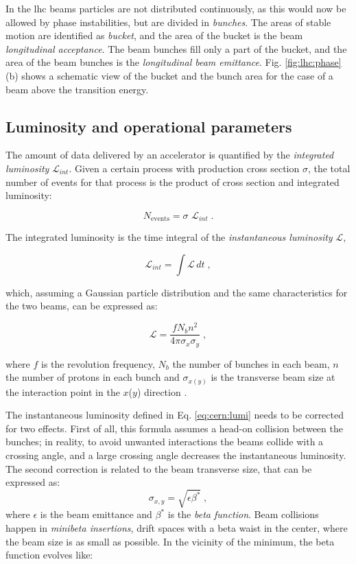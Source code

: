 In the \gls{lhc} beams particles are not distributed continuously, as this would now be allowed by phase instabilities, but are divided in \textit{bunches}. 
The areas of stable motion are identified as \textit{bucket}, and the area of the bucket is the beam \textit{longitudinal acceptance}. The beam bunches fill only a part of the bucket, and the area of the beam bunches is the \textit{longitudinal beam emittance}. Fig. \ref{fig:lhc:phase}(b) shows a schematic view of the bucket and the bunch area for the case of a beam above the transition energy. 

\subsection{Luminosity and operational parameters}

The amount of data delivered by an accelerator is quantified by the \textit{integrated luminosity} $\mathcal{L}_{int}$.
Given a certain process with production cross section $\sigma$, the total number of events for that process is the product of cross section and integrated luminosity:

\begin{equation}
\label{eq:cern:nev}
N_{\mathrm{events}} = \sigma \,\, \mathcal{L}_{int} \; .
\end{equation}

The integrated luminosity is the time integral of the \textit{instantaneous luminosity} $\mathcal{L}$, 

\begin{equation}
\label{eq:cern:intlumi}
\mathcal{L}_{int} = \int \mathcal{L} \, dt \; ,
\end{equation}

\noindent which, assuming a Gaussian particle distribution and the same characteristics for the two beams, can be expressed as:

\begin{equation}
\mathcal{L}=\frac{f N_b n^2}{4 \pi \sigma_{x}\sigma_{y} } \; ,
\label{eq:cern:lumi}
\end{equation}

\noindent where $f$ is the revolution frequency, $N_b$ the number of bunches in each beam, $n$ the number of protons in each bunch and $\sigma_{x(y)}$  is the transverse beam size at the interaction point in the $x$($y$) direction . 

The instantaneous luminosity defined in Eq. \ref{eq:cern:lumi} needs to be corrected for two effects. First of all, this formula assumes a head-on collision between the bunches; in reality, to avoid unwanted interactions the beams collide with a crossing angle, and a large crossing angle decreases the instantaneous luminosity. The second correction is related to the beam transverse size, that can be expressed as:
\begin{equation}
\sigma_{x,y} = \sqrt{  \epsilon \beta^* } \; ,
\end{equation}
where $\epsilon$ is the beam emittance and $\beta^*$ is the \textit{beta function}. Beam collisions happen in \textit{minibeta insertions}, drift spaces with a beta waist in the center, where the beam size is as small as possible. In the vicinity of the minimum, the beta function evolves like:


